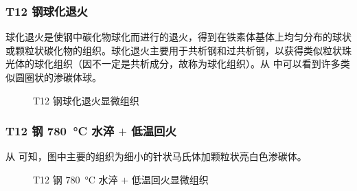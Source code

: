     \subsubsection{T12 钢球化退火}
    球化退火是使钢中碳化物球化而进行的退火，得到在铁素体基体上均匀分布的球状或颗粒状碳化物的组织。球化退火主要用于共析钢和过共析钢，以获得类似粒状珠光体的球化组织（因不一定是共析成分，故称为球化组织）。从 中可以看到许多类似圆圈状的渗碳体球。
    \begin{figure}[!ht]
        \hspace{20pt}
        \caption{T12 钢球化退火显微组织\label{fig:n12}}
    \end{figure}

    \subsubsection{T12 钢 \SI{780}{\degreeCelsius} 水淬 $+$ 低温回火\label{ss2:t12_780}}
    从 可知，图中主要的组织为细小的针状马氏体加颗粒状亮白色渗碳体。
    \begin{figure}[!ht]
        \hspace{20pt}
        \caption{T12 钢 \SI{780}{\degreeCelsius} 水淬 $+$ 低温回火显微组织\label{fig:n13}}
    \end{figure}

